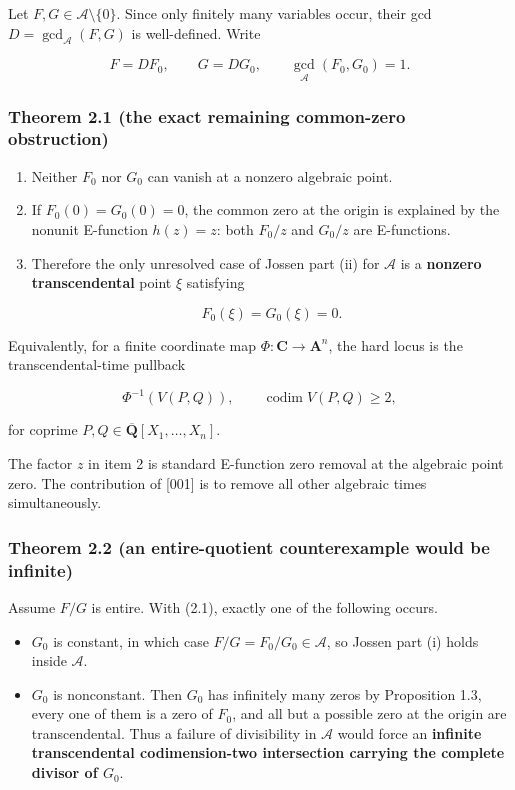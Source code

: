 \documentclass[11pt]{article}
\theoremstyle{keio}
\theoremstyle{definition}
\theoremstyle{remark}
\providecommand{\tightlist}{\setlength{\itemsep}{0pt}\setlength{\parskip}{0pt}}
\begin{document}
Let \(F,G\in\mathscr A\setminus\{0\}\). Since only finitely many variables
occur, their gcd \(D=\gcd_{\mathscr A}(F,G)\) is well-defined. Write

\[
  F=DF_0,\qquad G=DG_0,\qquad \gcd_{\mathscr A}(F_0,G_0)=1.    \tag{J-2.1}
\]

\subsubsection{Theorem 2.1 (the exact remaining common-zero obstruction)}

\begin{enumerate}
\def\labelenumi{\arabic{enumi}.}
\item
  Neither \(F_0\) nor \(G_0\) can vanish at a nonzero algebraic point.
\item
  If \(F_0(0)=G_0(0)=0\), the common zero at the origin is explained by
  the nonunit E-function \(h(z)=z\): both \(F_0/z\) and \(G_0/z\) are
  E-functions.
\item
  Therefore the only unresolved case of Jossen part (ii) for
  \(\mathscr A\) is a \textbf{nonzero transcendental} point \(\xi\) satisfying

  \[
    F_0(\xi)=G_0(\xi)=0.                                  \tag{J-2.2}
  \]
\end{enumerate}

Equivalently, for a finite coordinate map \(\Phi:\mathbf C\to\mathbf A^n\),
the hard locus is the transcendental-time pullback

\[
  \Phi^{-1}(V(P,Q)),\qquad \operatorname{codim}V(P,Q)\ge2,  \tag{J-2.3}
\]

for coprime \(P,Q\in\overline{\mathbf Q}[X_1,\ldots,X_n]\).

The factor \(z\) in item 2 is standard E-function zero removal at the
algebraic point zero.  The contribution of [001] is to remove all other
algebraic times simultaneously.

\subsubsection{Theorem 2.2 (an entire-quotient counterexample would be infinite)}

Assume \(F/G\) is entire. With (2.1), exactly one of the following occurs.

\begin{itemize}
\tightlist
\item
  \(G_0\) is constant, in which case \(F/G=F_0/G_0\in\mathscr A\), so
  Jossen part (i) holds inside \(\mathscr A\).
\item
  \(G_0\) is nonconstant. Then \(G_0\) has infinitely many zeros by
  Proposition 1.3, every one of them is a zero of \(F_0\), and all but a
  possible zero at the origin are transcendental. Thus a failure of
  divisibility in \(\mathscr A\) would force an \textbf{infinite transcendental
  codimension-two intersection carrying the complete divisor of \(G_0\)}.
\end{itemize}
\end{document}

